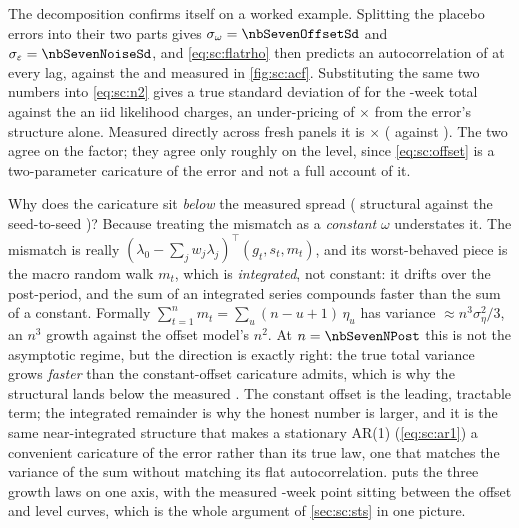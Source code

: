 The decomposition confirms itself on a worked example. Splitting the placebo errors into their two
parts gives $\sigma_\omega = \nbSevenOffsetSd$ and $\sigma_\varepsilon = \nbSevenNoiseSd$, and
\cref{eq:sc:flatrho} then predicts an autocorrelation of \nbSevenRhoImplied{} at every lag, against
the \nbSevenRhoOne{} and \nbSevenRhoEight{} measured in \cref{fig:sc:acf}. Substituting the same two
numbers into \cref{eq:sc:n2} gives a true standard deviation of \keur{\nbSevenTotalSdTrue} for the
\nbSevenNPost-week total against the \keur{\nbSevenTotalSdIid} an iid likelihood charges, an
under-pricing of \nbSevenTotalSdRatio$\times$ from the error's structure alone. Measured directly
across fresh panels it is \nbSevenUnderprice$\times$ (\keur{\nbSevenSeedSd} against
\keur{\nbSevenIidSd}). The two agree on the factor; they agree only roughly on the level, since
\cref{eq:sc:offset} is a two-parameter caricature of the error and not a full account of it.

Why does the caricature sit \emph{below} the measured spread (\keur{\nbSevenTotalSdTrue} structural
against the seed-to-seed \keur{\nbSevenSeedSd})? Because treating the mismatch as a \emph{constant}
$\omega$ understates it. The mismatch is really $(\lambda_0 - \sum_j w_j \lambda_j)^{\!\top}(g_t, s_t, m_t)$,
and its worst-behaved piece is the macro random walk $m_t$, which is \emph{integrated}, not constant:
it drifts over the post-period, and the sum of an integrated series compounds faster than the sum of
a constant. Formally $\sum_{t=1}^{n} m_t = \sum_u (n - u + 1)\,\eta_u$ has variance
$\approx n^{3}\sigma_\eta^{2}/3$, an $n^{3}$ growth against the offset model's $n^{2}$. At
$n = \nbSevenNPost$ this is not the asymptotic regime, but the direction is exactly right: the true
total variance grows \emph{faster} than the constant-offset caricature admits, which is why the
structural \keur{\nbSevenTotalSdTrue} lands below the measured \keur{\nbSevenSeedSd}. The constant
offset is the leading, tractable term; the integrated remainder is why the honest number is larger,
and it is the same near-integrated structure that makes a stationary AR(1) (\cref{eq:sc:ar1}) a
convenient caricature of the error rather than its true law, one that matches the variance of the
sum without matching its flat autocorrelation.  puts the three growth laws on
one axis, with the measured \nbSevenNPost-week point sitting between the offset and level curves,
which is the whole argument of \cref{sec:sc:sts} in one picture.


